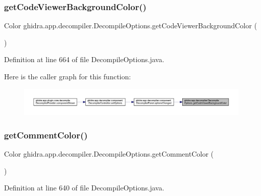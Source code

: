 \subsubsection{\texorpdfstring{getCodeViewerBackgroundColor()}{getCodeViewerBackgroundColor()}}
{\footnotesize\ttfamily Color ghidra.\+app.\+decompiler.\+Decompile\+Options.\+get\+Code\+Viewer\+Background\+Color (\begin{DoxyParamCaption}{ }\end{DoxyParamCaption})\hspace{0.3cm}{\ttfamily [inline]}}



Definition at line 664 of file Decompile\+Options.\+java.

Here is the caller graph for this function\+:
\nopagebreak
\begin{figure}[H]
\begin{center}
\leavevmode
\includegraphics[width=350pt]{classghidra_1_1app_1_1decompiler_1_1_decompile_options_ab805f3b221d2808b74624db5f2b7a74f_icgraph}
\end{center}
\end{figure}
\mbox{\label{classghidra_1_1app_1_1decompiler_1_1_decompile_options_a66c3d13d2f49f136534a566aa4b11a7e}} 
\subsubsection{\texorpdfstring{getCommentColor()}{getCommentColor()}}
{\footnotesize\ttfamily Color ghidra.\+app.\+decompiler.\+Decompile\+Options.\+get\+Comment\+Color (\begin{DoxyParamCaption}{ }\end{DoxyParamCaption})\hspace{0.3cm}{\ttfamily [inline]}}



Definition at line 640 of file Decompile\+Options.\+java.

\mbox{\label{classghidra_1_1app_1_1decompiler_1_1_decompile_options_a14dac87795d3d0e632384682723844d9}} 
